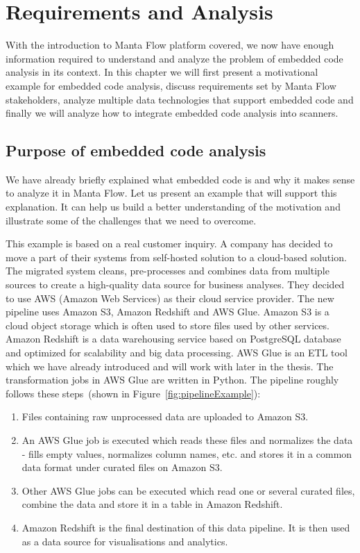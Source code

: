  \chapter{Requirements and Analysis}

With the introduction to Manta Flow platform covered, we now have enough information required to understand and analyze the problem of embedded code analysis in its context. In this chapter we will first present a motivational example for embedded code analysis, discuss requirements set by Manta Flow stakeholders, analyze multiple data technologies that support embedded code and finally we will analyze how to integrate embedded code analysis into scanners.

\section{Purpose of embedded code analysis}

We have already briefly explained what embedded code is and why it makes sense to analyze it in Manta Flow. Let us present an example that will support this explanation. It can help us build a better understanding of the motivation and illustrate some of the challenges that we need to overcome.
\par
This example is based on a real customer inquiry. A company has decided to move a part of their systems from self-hosted solution to a cloud-based solution. The migrated system cleans, pre-processes and combines data from multiple sources to create a high-quality data source for business analyses. They decided to use AWS (Amazon Web Services) as their cloud service provider. The new pipeline uses Amazon S3, Amazon Redshift and AWS Glue. Amazon S3 is a cloud object storage which is often used to store files used by other services. Amazon Redshift is a data warehousing service based on PostgreSQL database and optimized for scalability and big data processing. AWS Glue is an ETL tool which we have already introduced and will work with later in the thesis. The transformation jobs in AWS Glue are written in Python. The pipeline roughly follows these steps~(shown in Figure~\ref{fig:pipelineExample}):
\begin{enumerate}
    \item Files containing raw unprocessed data are uploaded to Amazon S3.
    \item An AWS Glue job is executed which reads these files and normalizes the data - fills empty values, normalizes column names, etc. and stores it in a common data format under curated files on Amazon S3.
    \item Other AWS Glue jobs can be executed which read one or several curated files, combine the data and store it in a table in Amazon Redshift.
    \item Amazon Redshift is the final destination of this data pipeline. It is then used as a data source for visualisations and analytics.
\end{enumerate}

